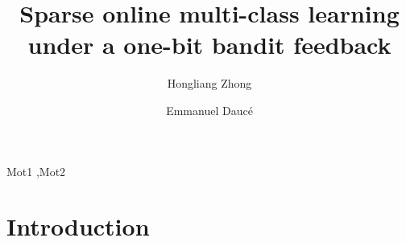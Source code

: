 \documentclass[preprint,12pt,authoryear]{elsarticle}
\begin{document}
\begin{frontmatter}



\title{Sparse online multi-class learning under a one-bit bandit feedback}


\author[centrale,lif]{Hongliang Zhong}
\author[centrale,ins]{Emmanuel Dauc\'e }

\address[centrale]{Ecole Centrale de Marseille}
\address[lif]{Laboratoire d'informatique Fondamentale}
\address[ins]{Institut de Neurosciences des Syst\`emes}


\begin{abstract}

\end{abstract}

\begin{keyword}
Mot1 \sep Mot2


\end{keyword}

\end{frontmatter}


\section{Introduction}
\label{sec:lentete}
\end{document}
